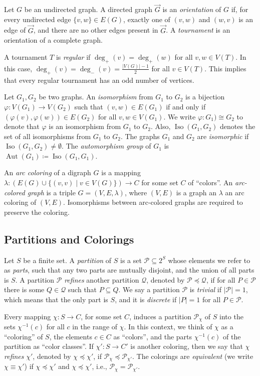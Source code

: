 \PassOptionsToPackage{dvipsnames,svgnames}{xcolor}\documentclass[10pt,a4paper]{article}
\newcommand{\CP}{{\mathcal P}}
\newcommand{\CQ}{{\mathcal Q}}
\DeclareMathOperator{\Aut}{Aut}
\DeclareMathOperator{\Iso}{Iso}
\begin{document}
Let $G$ be an undirected graph.
A directed graph $\vec{G}$ is an \emph{orientation} of $G$ if, for every undirected edge $\{v,w\} \in E(G)$,
exactly one of $(v,w)$ and $(w,v)$ is an edge of $\vec{G}$, and there are no other edges present in $\vec{G}$.
A \emph{tournament} is an orientation of a complete graph.

A tournament $T$ is \emph{regular} if $\deg_+(v) = \deg_+(w)$ for all $v,w \in V(T)$.
In this case, $\deg_+(v) = \deg_-(v) = \frac{|V(G)|-1}{2}$ for all $v \in V(T)$.
This implies that every regular tournament has an odd number of vertices.

Let $G_1,G_2$ be two graphs.
An \emph{isomorphism} from $G_1$ to $G_2$ is a bijection $\varphi\colon V(G_1) \to V(G_2)$ such that $(v,w) \in E(G_1)$ if and only if $(\varphi(v),\varphi(w)) \in E(G_2)$ for all $v,w \in V(G_1)$.
We write $\varphi\colon G_1) \cong G_2$ to denote that $\varphi$ is an isomorphism from $G_1$ to $G_2$.
Also, $\Iso(G_1,G_2)$ denotes the set of all isomorphisms from $G_1$ to $G_2$.
The graphs $G_1$ and $G_2$ are \emph{isomorphic} if $\Iso(G_1,G_2) \neq \emptyset$.
The \emph{automorphism group} of $G_1$ is $\Aut(G_1) \coloneqq \Iso(G_1,G_1)$.

An \emph{arc coloring} of a digraph $G$ is a mapping $\lambda\colon (E(G) \cup \{(v,v)\mid v\in V(G)\}) \to C$ for some set $C$ of ``colors''.
An \emph{arc-colored graph} is a triple $G=(V,E,\lambda)$, where $(V,E)$ is a graph an $\lambda$ an arc coloring of $(V,E)$.
Isomorphisms between arc-colored graphs are required to preserve the coloring.


\subsection{Partitions and Colorings}

Let $S$ be a finite set.
A \emph{partition} of $S$ is a set $\CP\subseteq 2^S$ whose elements we refer to as \emph{parts},
such that any two parts are mutually disjoint, and the union of all parts is $S$.
A partition $\CP$ \emph{refines} another partition $\CQ$, denoted by $\CP \preceq \CQ$, if for all $P \in \CP$ there is some $Q \in \CQ$ such that $P \subseteq Q$.
We say a partition $\CP$ is \emph{trivial} if $|\CP| = 1$, which means that the only part is $S$, and it is \emph{discrete} if $|P| = 1$ for all $P \in \CP$.

Every mapping $\chi\colon S\to C$, for some set $C$, induces a partition $\CP_\chi$ of $S$ into the sets $\chi^{-1}(c)$ for all $c$ in the range of $\chi$.
In this context, we think of $\chi$ as a ``coloring'' of $S$, the elements $c\in C$ as ``colors'', and the parts $\chi^{-1}(c)$ of the partition as ``color classes''.
If $\chi'\colon S\to C'$ is another coloring, then we say that $\chi$ \emph{refines} $\chi'$, denoted by $\chi \preceq \chi'$, if $\CP_\chi \preceq \CP_{\chi'}$.
The colorings are \emph{equivalent} (we write $\chi \equiv \chi'$) if $\chi \preceq \chi'$ and $\chi \preceq \chi'$, i.e., $\CP_\chi = \CP_{\chi'}$.
\end{document}
